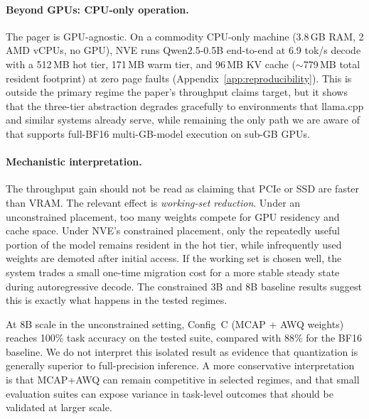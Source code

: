 \documentclass{article}
\begin{document}
\paragraph{Beyond GPUs: CPU-only operation.} The pager is GPU-agnostic. On a
commodity CPU-only machine (3.8\,GB RAM, 2 AMD vCPUs, no GPU), NVE runs
Qwen2.5-0.5B end-to-end at 6.9 tok/s decode with a 512\,MB hot tier, 171\,MB
warm tier, and 96\,MB KV cache ($\sim$779\,MB total resident footprint) at
zero page faults (Appendix~\ref{app:reproducibility}). This is outside the
primary regime the paper's throughput claims target, but it shows that the
three-tier abstraction degrades gracefully to environments that llama.cpp and
similar systems already serve, while remaining the only path we are aware of
that supports full-BF16 multi-GB-model execution on sub-GB GPUs.

\paragraph{Mechanistic interpretation.} The throughput gain should not be read as claiming
that PCIe or SSD are faster than VRAM. The relevant effect is \emph{working-set reduction}.
Under an unconstrained placement, too many weights compete for GPU residency and cache space.
Under NVE's constrained placement, only the repeatedly useful portion of the model remains
resident in the hot tier, while infrequently used weights are demoted after initial access.
If the working set is chosen well, the system trades a small one-time migration cost for a
more stable steady state during autoregressive decode. The constrained 3B and 8B baseline
results suggest this is exactly what happens in the tested regimes.

At 8B scale in the unconstrained setting, Config~C (MCAP + AWQ weights) reaches 100\%
task accuracy on the tested suite, compared with 88\% for the BF16 baseline. We do not
interpret this isolated result as evidence that quantization is generally superior to
full-precision inference. A more conservative interpretation is that MCAP+AWQ can remain
competitive in selected regimes, and that small evaluation suites can expose variance in
task-level outcomes that should be validated at larger scale.
\end{document}

